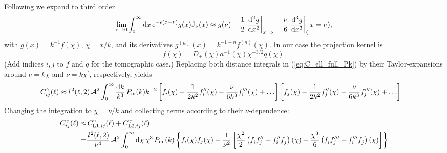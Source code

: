 \documentclass[fleqn,usenatbib]{mnras} %
\newcommand{\ellbar}{\hbox{\it \l}\,}
\newcommand{\pref}{{\cal A}}
\begin{document}
Following \cite{2008PhRvD..78l3506L} we expand to third order
%
\begin{equation}
  \lim_{\varepsilon \rightarrow 0} \int_0^\infty {\rm d} x \, {\rm e}^{-\epsilon (x - \nu)} g(x) {\rm J}_\nu(x)
  \approx g(\nu) - \frac 1 2 \left.\frac{{\rm d}^2 g}{{\rm d} x^2}\right|_{x=\nu}
                 - \frac \nu 6 \left.\frac{{\rm d}^3 g}{{\rm d} x^3}\right|_(x=\nu) ,
\end{equation}
%
with $g(x) = k^{-1} f(\chi)$, $\chi=x/k$, and its derivatives $g^{(n)}(x) =
k^{-1-n} f^{(n)}(\chi)$. In our case the projection kernel is
%
\begin{equation}
  f(\chi) = D_+(\chi) a^{-1}(\chi) \chi^{-3/2} q(\chi).
  \label{eq:f_LA08}
\end{equation}
%
(Add indices $i, j$ to $f$ and $q$ for the tomographic case.)
%
Replacing both distance integrals in (\ref{eq:C_ell_full_Pk}) by their Taylor-expansions around $\nu = k \chi$ and $\nu = k \chi^\prime$,
respectively, yields
%
\begin{align}
  C^\gamma_{ij}(\ell) \approx & \, \ellbar^2(\ell, 2) \, \pref^2
    \int_0^\infty \frac{{\rm d} k}{k^3} \, P_{\rm m}(k) k^{-2}
    \left[ f_i(\chi) - \frac{1}{2 k^2} f_i^{\prime\prime}(\chi)
      - \frac{\nu}{6 k^3} f_i^{\prime\prime\prime}(\chi) + \ldots \right]
    \left[ f_j(\chi) - \frac{1}{2 k^2} f_j^{\prime\prime}(\chi)
    - \frac{\nu}{6 k^3} f_j^{\prime\prime\prime}(\chi) + \ldots \right]
  \label{eq:C_ell_limber2_dk}
\end{align}
%
Changing the integration to $\chi = \nu/k$ and collecting terms according to their $\nu$-dependence:
%
\begin{align}
  C^\gamma_{ij}(\ell) \approx & \, C^\gamma_{{\rm L1}, ij}(\ell) + C^\gamma_{{\rm L2}, ij}(\ell)
      \nonumber \\
    = & \frac{\ellbar^2(\ell, 2)}{\nu^4} \, \pref^2
    \int_0^\infty {\rm d} \chi \, \chi^3 \, P_{\rm m}\left( k \right)
    \left\{
    f_i(\chi) f_j(\chi)
     - \frac 1 {\nu^2} \left[ \frac{\chi^2}{2} \left( f^{}_i f^{\prime\prime}_j + f_i^{\prime\prime} f^{}_j \right)(\chi)
    + \frac{\chi^3}{6} \left( f^{}_i f^{\prime\prime\prime}_j + f^{\prime\prime\prime}_i f^{}_j \right)(\chi)
    \right]
    \right\}
  \label{eq:C_ell_limber12_dr}
\end{align}
\end{document}
